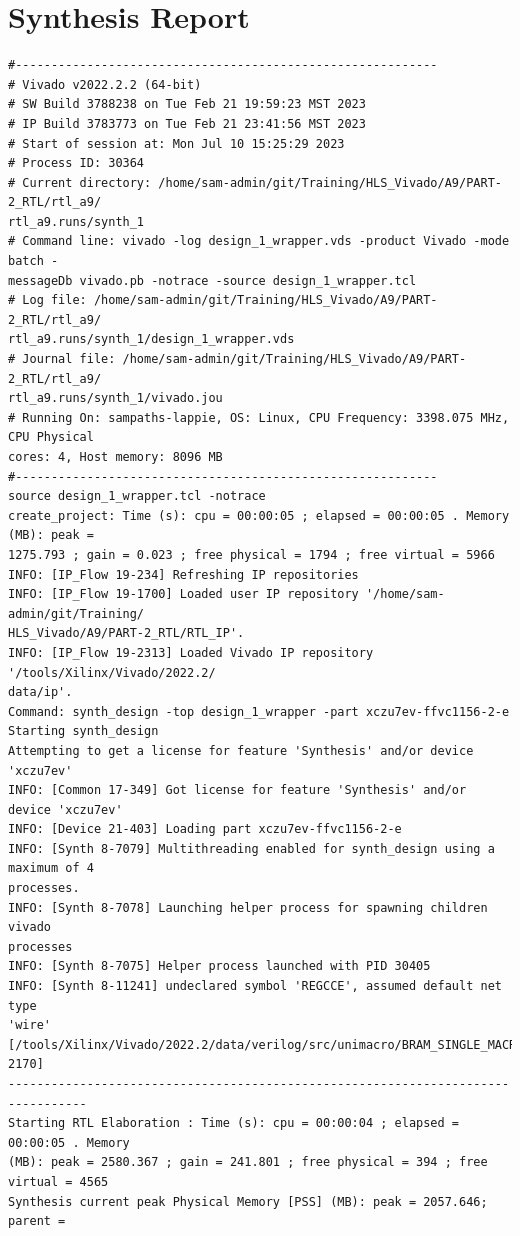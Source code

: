 \documentclass{article}
\begin{document}
\section{Synthesis Report}
\begin{lstlisting}
#-----------------------------------------------------------
# Vivado v2022.2.2 (64-bit)
# SW Build 3788238 on Tue Feb 21 19:59:23 MST 2023
# IP Build 3783773 on Tue Feb 21 23:41:56 MST 2023
# Start of session at: Mon Jul 10 15:25:29 2023
# Process ID: 30364
# Current directory: /home/sam-admin/git/Training/HLS_Vivado/A9/PART-2_RTL/rtl_a9/
rtl_a9.runs/synth_1
# Command line: vivado -log design_1_wrapper.vds -product Vivado -mode batch -
messageDb vivado.pb -notrace -source design_1_wrapper.tcl
# Log file: /home/sam-admin/git/Training/HLS_Vivado/A9/PART-2_RTL/rtl_a9/
rtl_a9.runs/synth_1/design_1_wrapper.vds
# Journal file: /home/sam-admin/git/Training/HLS_Vivado/A9/PART-2_RTL/rtl_a9/
rtl_a9.runs/synth_1/vivado.jou
# Running On: sampaths-lappie, OS: Linux, CPU Frequency: 3398.075 MHz, CPU Physical 
cores: 4, Host memory: 8096 MB
#-----------------------------------------------------------
source design_1_wrapper.tcl -notrace
create_project: Time (s): cpu = 00:00:05 ; elapsed = 00:00:05 . Memory (MB): peak = 
1275.793 ; gain = 0.023 ; free physical = 1794 ; free virtual = 5966
INFO: [IP_Flow 19-234] Refreshing IP repositories
INFO: [IP_Flow 19-1700] Loaded user IP repository '/home/sam-admin/git/Training/
HLS_Vivado/A9/PART-2_RTL/RTL_IP'.
INFO: [IP_Flow 19-2313] Loaded Vivado IP repository '/tools/Xilinx/Vivado/2022.2/
data/ip'.
Command: synth_design -top design_1_wrapper -part xczu7ev-ffvc1156-2-e
Starting synth_design
Attempting to get a license for feature 'Synthesis' and/or device 'xczu7ev'
INFO: [Common 17-349] Got license for feature 'Synthesis' and/or device 'xczu7ev'
INFO: [Device 21-403] Loading part xczu7ev-ffvc1156-2-e
INFO: [Synth 8-7079] Multithreading enabled for synth_design using a maximum of 4 
processes.
INFO: [Synth 8-7078] Launching helper process for spawning children vivado 
processes
INFO: [Synth 8-7075] Helper process launched with PID 30405
INFO: [Synth 8-11241] undeclared symbol 'REGCCE', assumed default net type 
'wire' [/tools/Xilinx/Vivado/2022.2/data/verilog/src/unimacro/BRAM_SINGLE_MACRO.v:
2170]
---------------------------------------------------------------------------------
Starting RTL Elaboration : Time (s): cpu = 00:00:04 ; elapsed = 00:00:05 . Memory 
(MB): peak = 2580.367 ; gain = 241.801 ; free physical = 394 ; free virtual = 4565
Synthesis current peak Physical Memory [PSS] (MB): peak = 2057.646; parent = 

\end{lstlisting}
\end{document}
